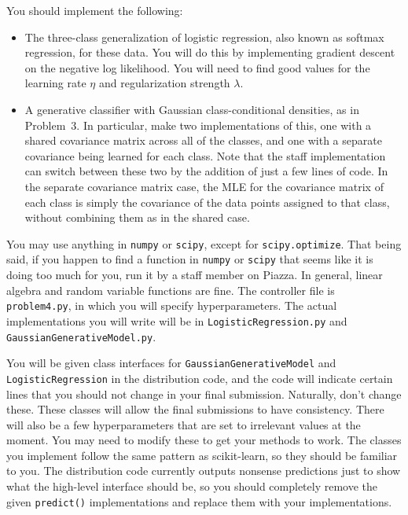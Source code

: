 \documentclass[submit]{harvardml}
\begin{document}
\begin{problem}
You should implement the following:
\begin{itemize}
\item The three-class generalization of logistic regression, also
  known as softmax regression, for these data. You will do this by implementing
  gradient descent on the negative log likelihood. You will need to find good values for the learning rate $\eta$ and regularization strength $\lambda$.
%
\item A generative classifier with Gaussian
  class-conditional densities, as in Problem~3. In particular, make
  two implementations of this, one with a shared covariance matrix
  across all of the classes, and one with a separate covariance being
  learned for each class.  Note that the staff implementation can
  switch between these two by the addition of just a few lines of
  code. In the separate covariance matrix case, the MLE for the
  covariance matrix of each class is simply the covariance of the data
  points assigned to that class, without combining them as in the
  shared case.
\end{itemize}
You may use anything in  \texttt{numpy} or \texttt{scipy}, except for \texttt{scipy.optimize}. That being said, if you happen to find a function in \texttt{numpy} or \texttt{scipy} that seems like it is doing too much for you, run it by a staff member on Piazza. In general, linear algebra and random variable functions are fine. The controller file is \texttt{problem4.py}, in which you will specify hyperparameters. The actual implementations you will write will be in \texttt{LogisticRegression.py} and \texttt{GaussianGenerativeModel.py}.


You will be given class interfaces for \texttt{GaussianGenerativeModel} and \texttt{LogisticRegression} in the distribution code, 
and the code will indicate certain lines that you should not change in your final submission. Naturally, don't change these.
These classes will allow the final submissions to have consistency. There will also be a few hyperparameters that are set to
irrelevant values at the moment. You may need to modify these to get your methods to work.
The classes you implement follow the same pattern as scikit-learn, so they should be familiar to you. The distribution code currently outputs nonsense predictions just to show what the high-level interface should be, so you should completely remove the given \texttt{predict()} implementations and replace them with your implementations.


\end{problem}
\end{document}
